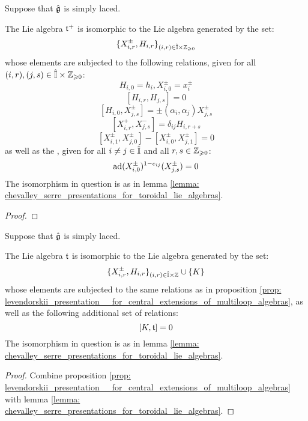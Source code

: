         \begin{proposition} \label{prop: levendorskii_presentation__for_central_extensions_of_multiloop_algebras}
            Suppose that $\hat{\mathfrak{g}}$ is simply laced.
        
            The Lie algebra $\mathfrak{t}^+$ is isomorphic to the Lie algebra  generated by the set:
                $$\{ X_{i, r}^{\pm}, H_{i, r} \}_{(i, r) \in \hat{\simpleroots} \x \Z_{\geq 0}}$$
            whose elements are subjected to the following relations, given for all $(i, r), (j, s) \in \hat{\simpleroots} \x \Z_{\geq 0}$:
                $$H_{i, 0} = h_i, X_{i, 0}^{\pm} = x_i^{\pm}$$
                $$[ H_{i, r}, H_{j, s} ] = 0$$
                $$[ H_{i, 0}, X_{j, s}^{\pm} ] = \pm (\alpha_i, \alpha_j) X_{j, s}^{\pm}$$
                $$[ X_{i, r}^+, X_{j, s}^- ] = \delta_{ij} H_{i, r + s}$$
                $$[ X_{i, 1}^{\pm}, X_{j, 0}^{\pm} ] - [ X_{i, 0}^{\pm}, X_{j, 1}^{\pm} ] = 0$$
            as well as the , given for all $i \not = j \in \hat{\mathbb{I}}$ and all $r, s \in \mathbb{Z}_{\geqslant 0}$:
                $$\mathrm{ad}(X_{i, 0}^{\pm})^{1 - c_{ij}}( X_{j, s}^{\pm} ) = 0$$
            The isomorphism in question is as in lemma \ref{lemma: chevalley_serre_presentations_for_toroidal_lie_algebras}.
        \end{proposition}
            \begin{proof}
                
            \end{proof}
        \begin{corollary}
            Suppose that $\hat{\mathfrak{g}}$ is simply laced.
            
            The Lie algebra $\mathfrak{t}$ is isomorphic to the Lie algebra  generated by the set:
                $$\{ X_{i, r}^{\pm}, H_{i, r} \}_{(i, r) \in \hat{\simpleroots} \x \Z} \cup \{ K \}$$
            whose elements are subjected to the same relations as in proposition \ref{prop: levendorskii_presentation__for_central_extensions_of_multiloop_algebras}, as well as the following additional set of relations:
                $$[K, \mathfrak{t}] = 0$$
            The isomorphism in question is as in lemma \ref{lemma: chevalley_serre_presentations_for_toroidal_lie_algebras}.
        \end{corollary}
            \begin{proof}
                Combine proposition \ref{prop: levendorskii_presentation__for_central_extensions_of_multiloop_algebras} with lemma \ref{lemma: chevalley_serre_presentations_for_toroidal_lie_algebras}. 
            \end{proof}
